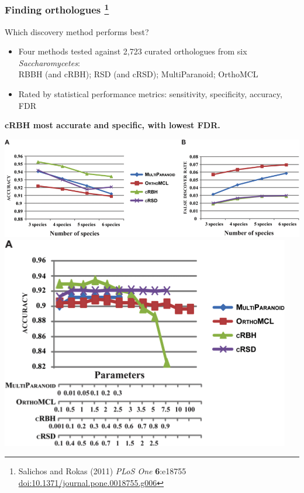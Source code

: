 \begin{frame}
  \frametitle{Finding orthologues
    \footnote{\tiny{Salichos and Rokas (2011) \textit{PLoS One} \textbf{6}:e18755 \href{http://dx.doi.org/10.1371/journal.pone.0018755.g006}{doi:10.1371/journal.pone.0018755.g006}}}
  }
  \begin{block}{Which discovery method performs best?}
    \begin{itemize}
      \item Four methods tested against 2,723 curated orthologues from six \textit{Saccharomycetes}: \\
    \textcolor{hutton_green}{RBBH (and cRBH); RSD (and cRSD); MultiParanoid; OrthoMCL} \\
      \item \textcolor{hutton_blue}{Rated by statistical performance metrics: sensitivity, specificity, accuracy, FDR}
    \end{itemize}
  \end{block}
  \textcolor{hutton_purple}{\textbf{cRBH most accurate and specific, with lowest FDR.}}
  \begin{center}
      \includegraphics[height=0.25\textheight]{images/salichos_results1} 
      \includegraphics[height=0.25\textheight]{images/salichos_results2}      
  \end{center}
\end{frame}

